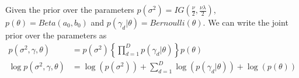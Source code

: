 \documentclass[a4paper,11pt]{article}
\begin{document}
\begin{pmisolution}
\begin{equation}
\end{equation}
Given the prior over the parameters $p(\sigma^2) = IG \left(\frac{\nu}{2}, \frac{\nu\lambda}{2}\right)$, $p(\theta) = Beta(a_0, b_0)$ and $p(\gamma_d|\theta) = Bernoulli(\theta)$. We can write the joint prior over the parameters as
\begin{equation}
\label{eqn3_6}
\begin{split}
    p(\sigma^2, \gamma, \theta) &= p(\sigma^2) \left \{ \prod_{d=1}^Dp(\gamma_d|\theta) \right\} p(\theta) 
    \\ \log p \left(\sigma^2, \gamma, \theta \right) &= \log \left( p(\sigma^2) \right) + \sum_{d=1}^D \log \left( p(\gamma_d|\theta) \right) + \log \left( p(\theta) \right)
\end{split}
\end{equation}


\end{pmisolution}
\end{document}
